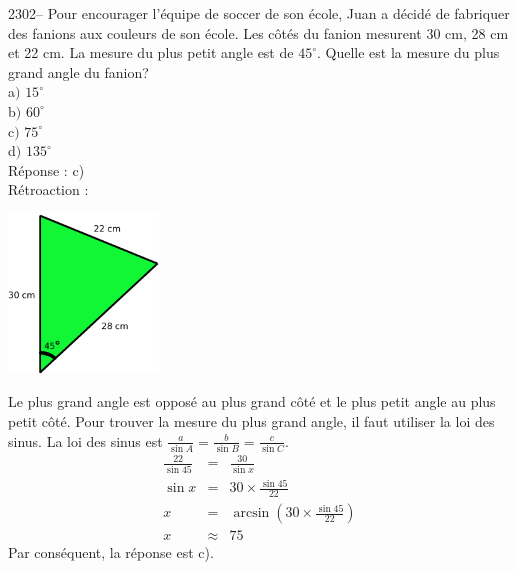\documentclass[letterpaper, 12pt]{article}
\begin{document}

2302-- Pour encourager l'\'equipe de soccer de son \'ecole, Juan a d\'ecid\'e de fabriquer des fanions aux couleurs de son \'ecole. Les c\^ot\'es du fanion mesurent 30 cm, 28 cm et 22 cm. La mesure du plus petit angle est de $45^{\circ}$. Quelle est la mesure du plus grand angle du fanion? \\

a$)$ $15^{\circ}$\\
b$)$ $60^{\circ}$\\
c$)$ $75^{\circ}$\\
d$)$ $135^{\circ}$\\

R\'eponse : c)\\

R\'etroaction :
\begin{center}
 \includegraphics[width=4cm,bb=14 14 520 572]{Q2302.eps}
\end{center}
Le plus grand angle est oppos\'e au plus grand c\^ot\'e et le plus petit angle au plus petit c\^ot\'e. Pour trouver la mesure du plus grand angle, il faut utiliser la loi des sinus. La loi des sinus est $\frac{a}{\sin{A}}=\frac{b}{\sin{B}}=\frac{c}{\sin{C}}$.
\begin{eqnarray*}
\frac{22}{\sin{45}}&=&\frac{30}{\sin{x}}\\[2mm]
\sin{x}&=&30\times\frac{\sin{45}}{22}\\[2mm]
x&=&\arcsin{\left(30\times\frac{\sin{45}}{22}\right)}\\[2mm]
x&\approx&75
\end{eqnarray*}
Par cons\'equent, la r\'eponse est c).\\
\end{document}
